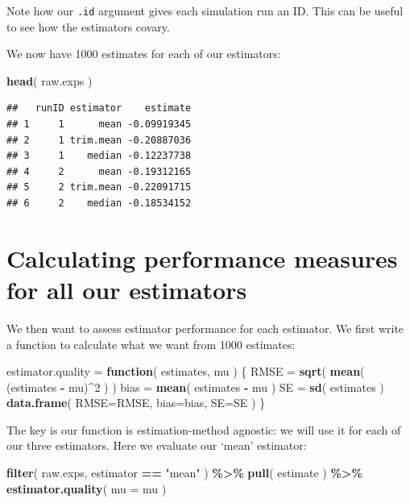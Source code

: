\documentclass[
]{book}
\newenvironment{Shaded}{\begin{snugshade}}{\end{snugshade}}
\newcommand{\AttributeTok}[1]{\textcolor[rgb]{0.13,0.29,0.53}{#1}}
\newcommand{\ControlFlowTok}[1]{\textcolor[rgb]{0.13,0.29,0.53}{\textbf{#1}}}
\newcommand{\DecValTok}[1]{\textcolor[rgb]{0.00,0.00,0.81}{#1}}
\newcommand{\FunctionTok}[1]{\textcolor[rgb]{0.13,0.29,0.53}{\textbf{#1}}}
\newcommand{\NormalTok}[1]{#1}
\newcommand{\OtherTok}[1]{\textcolor[rgb]{0.56,0.35,0.01}{#1}}
\newcommand{\SpecialCharTok}[1]{\textcolor[rgb]{0.81,0.36,0.00}{\textbf{#1}}}
\newcommand{\StringTok}[1]{\textcolor[rgb]{0.31,0.60,0.02}{#1}}
\begin{document}
Note how our \texttt{.id} argument gives each simulation run an ID. This can be
useful to see how the estimators covary.

We now have 1000 estimates for each of our estimators:

\begin{Shaded}
\begin{Highlighting}[]
\FunctionTok{head}\NormalTok{( raw.exps )}
\end{Highlighting}
\end{Shaded}

\begin{verbatim}
##   runID estimator    estimate
## 1     1      mean -0.09919345
## 2     1 trim.mean -0.20887036
## 3     1    median -0.12237738
## 4     2      mean -0.19312165
## 5     2 trim.mean -0.22091715
## 6     2    median -0.18534152
\end{verbatim}

\section{Calculating performance measures for all our estimators}\label{calculating-performance-measures-for-all-our-estimators}

We then want to assess estimator performance for each estimator.
We first write a function to calculate what we want from 1000 estimates:

\begin{Shaded}
\begin{Highlighting}[]
\NormalTok{estimator.quality }\OtherTok{=} \ControlFlowTok{function}\NormalTok{( estimates, mu ) \{}
\NormalTok{    RMSE }\OtherTok{=} \FunctionTok{sqrt}\NormalTok{( }\FunctionTok{mean}\NormalTok{( (estimates }\SpecialCharTok{{-}}\NormalTok{ mu)}\SpecialCharTok{\^{}}\DecValTok{2}\NormalTok{ ) )}
\NormalTok{    bias }\OtherTok{=} \FunctionTok{mean}\NormalTok{( estimates }\SpecialCharTok{{-}}\NormalTok{ mu )}
\NormalTok{    SE }\OtherTok{=} \FunctionTok{sd}\NormalTok{( estimates )}
    \FunctionTok{data.frame}\NormalTok{( }\AttributeTok{RMSE=}\NormalTok{RMSE, }\AttributeTok{bias=}\NormalTok{bias, }\AttributeTok{SE=}\NormalTok{SE )}
\NormalTok{\}}
\end{Highlighting}
\end{Shaded}

The key is our function is estimation-method agnostic: we will use it for each of our three estimators.
Here we evaluate our `mean' estimator:

\begin{Shaded}
\begin{Highlighting}[]
\FunctionTok{filter}\NormalTok{( raw.exps, estimator }\SpecialCharTok{==} \StringTok{"mean"}\NormalTok{ ) }\SpecialCharTok{\%\textgreater{}\%}
    \FunctionTok{pull}\NormalTok{( estimate ) }\SpecialCharTok{\%\textgreater{}\%}
    \FunctionTok{estimator.quality}\NormalTok{( }\AttributeTok{mu =}\NormalTok{ mu )}
\end{Highlighting}
\end{Shaded}
\end{document}
